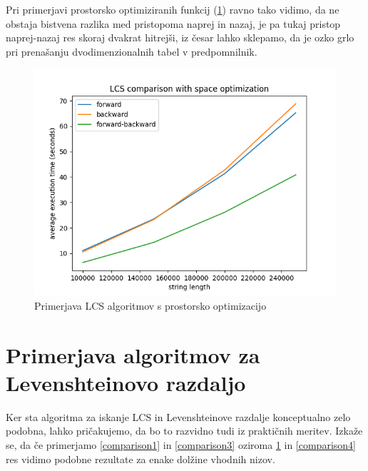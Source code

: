 \documentclass[a4paper,12pt,openright]{book}
\begin{document}
Pri primerjavi prostorsko optimiziranih funkcij (\ref{comparison2}) ravno tako vidimo, da ne obstaja bistvena razlika med pristopoma naprej in nazaj, je pa tukaj pristop naprej-nazaj res skoraj dvakrat hitrejši, iz česar lahko sklepamo, da je ozko grlo pri prenašanju dvodimenzionalnih tabel v predpomnilnik. 

\begin{figure}[htb]
\begin{center}
\includegraphics[width=1.0\textwidth]{plots/LCS_comparison_space.png}
\end{center}
\caption{Primerjava LCS algoritmov s prostorsko optimizacijo}
\label{comparison2}
\end{figure}

\section{Primerjava algoritmov za Levenshteinovo razdaljo}

Ker sta algoritma za iskanje LCS in Levenshteinove razdalje konceptualno zelo podobna, lahko pričakujemo, da bo to razvidno tudi iz praktičnih meritev. Izkaže se, da če primerjamo \ref{comparison1} in \ref{comparison3} oziroma \ref{comparison2} in \ref{comparison4} res vidimo podobne rezultate za enake dolžine vhodnih nizov. 
\end{document}
